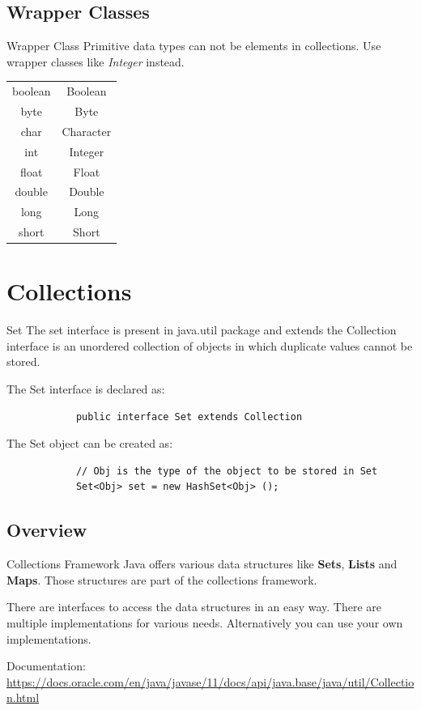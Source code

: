 	\subsection{Wrapper Classes}
	
	\begin{frame}{Wrapper Class}
		Primitive data types can not be elements in collections. 
		Use wrapper classes like \emph{Integer} instead.
		\begin{center}
			\begin{tabular}{ c  c }
				boolean & Boolean \\
				byte & Byte \\
				char & Character \\
				int & Integer \\
				float & Float \\
				double & Double \\
				long & Long \\
				short & Short
			\end{tabular}
		\end{center}
	\end{frame}
	
	\section{Collections}
	
	\begin{frame}[fragile]{Set}
		The set interface is present in java.util package and extends the Collection interface is an unordered collection of objects in which duplicate values cannot be stored. 
		
		The Set interface is declared as:
		\begin{lstlisting}
			public interface Set extends Collection 
		\end{lstlisting}
		
		The Set object can be created as:
		\begin{lstlisting}
			// Obj is the type of the object to be stored in Set 
			Set<Obj> set = new HashSet<Obj> (); 
		\end{lstlisting}
		
	\end{frame}
	
	\subsection{Overview}
	\begin{frame}{Collections Framework}
		Java offers various data structures like \textbf{Sets}, \textbf{Lists} and \textbf{Maps}.
		Those structures are part of the collections framework.
		
		There are interfaces to access the data structures in an easy way.
		There are multiple implementations for various needs.
		Alternatively you can use your own implementations.
		
		Documentation: \url{https://docs.oracle.com/en/java/javase/11/docs/api/java.base/java/util/Collection.html}
	\end{frame}
	
